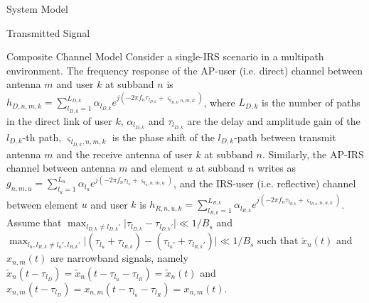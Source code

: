 \documentclass{IEEEtran}
\begin{document}
\begin{section} {System Model}
\begin{subsection} {Transmitted Signal}
        \end{subsection}

        \begin{subsection} {Composite Channel Model}
            Consider a single-IRS scenario in a multipath environment. The frequency response of the AP-user (i.e. direct) channel between antenna $m$ and user $k$ at subband $n$ is $h_{D,n,m,k} = \sum_{l_{D,k}=1}^{L_{D,k}} \alpha_{l_{D,k}} e^{j\left( -2 \pi f_n \tau_{l_{D,k}}+\varsigma_{l_{D,k},n,m,k} \right)}$, where $L_{D,k}$ is the number of paths in the direct link of user $k$, $\alpha_{l_{D,k}}$ and $\tau_{l_{D,k}}$ are the delay and amplitude gain of the $l_{D,k}$-th path, $\varsigma_{l_{D,k},n,m,k}$ is the phase shift of the $l_{D,k}$-path between transmit antenna $m$ and the receive antenna of user $k$ at subband $n$. Similarly, the AP-IRS channel between antenna $m$ and element $u$ at subband $n$ writes as $g_{n,m,u} = \sum_{l_u=1}^{L_u} \alpha_{l_u} e^{j\left( -2 \pi f_n \tau_{l_u}+\varsigma_{l_u,n,m,u} \right)}$, and the IRS-user (i.e. reflective) channel between element $u$ and user $k$ is $h_{R,n,u,k} = \sum_{l_{R,k}=1}^{L_{R,k}} \alpha_{l_{R,k}} e^{j\left( -2 \pi f_n \tau_{l_{R,k}}+\varsigma_{l_{R,k},n,u,k} \right)}$. Assume that $\max_{l_{D,k} \neq l_{D,k}'} \lvert \tau_{l_{D,k}}-\tau_{l_{D,k}'} \rvert \ll 1/B_s$ and $\max_{l_u,l_{R,k} \neq l_u',l_{R,k}'} \lvert \left( \tau_{l_u}+\tau_{l_{R,k}} \right)-\left( \tau_{l_u'}+\tau_{l_{R,k}'} \right) \rvert \ll 1/B_s$ such that $\tilde{x}_n(t)$ and $x_{n,m}(t)$ are narrowband signals, namely $\tilde{x}_n(t-\tau_{l_D}) = \tilde{x}_n(t-\tau_{l_u}-\tau_{l_R}) = \tilde{x}_n(t)$ and $x_{n,m}(t-\tau_{l_D}) = x_{n,m}(t-\tau_{l_u}-\tau_{l_R}) = x_{n,m}(t)$.


\end{subsection}
\end{section}
\end{document}
